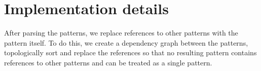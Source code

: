 \section{Implementation details}

After parsing the patterns, we replace references to other patterns with the 
pattern itself. To do this, we create a dependency graph between the patterns, 
topologically sort and replace the references so that no resulting pattern 
contains references to other patterns and can be treated as a single pattern.

\cleardoublepage
